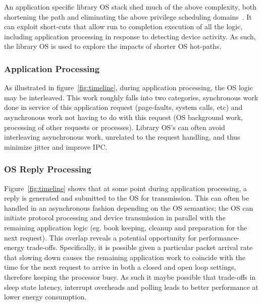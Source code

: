 An application specific library OS stack shed much of the above complexity, both shortening the path and eliminating the above privilege scheduling domains~\cite{arrakis,ix,EbbRT}. It can exploit short-cuts that allow run to completion execution of all the logic, including application processing in response to detecting device activity. As such, the library OS is used to explore the impacts of shorter OS hot-paths.

\subsubsection{Application Processing}
\label{sec:workflow:appproc}


As illustrated in figure~\ref{fig:timeline}, during application processing, the OS logic may be interleaved.  This work roughly falls into two categories, synchronous work done in service of this application request (page-faults, system calls, etc) and asynchronous work not having to do with this request (OS background work, processing of other requests or processes). Library OS's can often avoid interleaving asynchronous work, unrelated to the request handling,  and thus minimize jitter and improve IPC. %

\subsubsection{OS Reply Processing}
\label{sec:workflow:osrepproc}

Figure~\ref{fig:timeline} shows that at some point during application processing, a reply is generated and submitted to the OS for transmission.  This can often be handled in an asynchronous fashion depending on the OS semantics;  the OS can initiate protocol processing and device transmission in parallel with the remaining application logic (eg. book keeping, cleanup and preparation for the next request). This overlap reveals a potential opportunity for performance-energy trade-offs. Specifically, it is possible given a particular packet arrival rate that slowing down causes the remaining application work to coincide with the time for the next request to arrive in both a closed and open loop settings, therefore keeping the processor busy. As such it maybe possible that trade-offs in sleep state latency, interrupt overheads and polling leads to better performance at lower energy consumption.  

